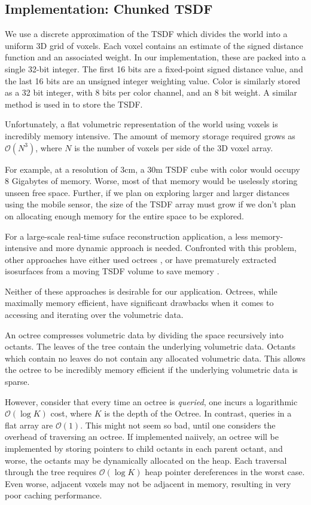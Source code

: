 \documentclass[conference,10pt]{IEEEtran}
\begin{document}
\subsection{Implementation: Chunked TSDF}
We use a discrete approximation of the TSDF which divides the world into
a uniform 3D grid of voxels. Each voxel contains an estimate of the signed
distance function and an associated weight. In our implementation, these are
packed into a single 32-bit integer. The first 16 bits are a fixed-point
signed distance value, and the last 16 bits  are an unsigned integer weighting
value. Color is similarly stored as a 32 bit integer, with 8 bits per color
channel, and an 8 bit weight. A similar method is used in \cite{Newcombe,
Whelan2013, Bylow2013} to store the TSDF.

Unfortunately, a flat volumetric representation of the world using voxels is
incredibly memory intensive. The amount of memory storage required grows as
$\mathcal{O}(N^3)$, where $N$ is the number of voxels per side of the 3D voxel
array.

For example, at a resolution of $3\text{cm}$,  a $30\text{m}$ TSDF cube with
color would occupy 8 Gigabytes of memory. Worse, most of that memory would be
uselessly storing unseen free space. Further, if we plan on exploring larger and larger
distances using the mobile sensor, the size of the TSDF array must grow if we
don't plan on allocating enough memory for the entire space to be explored.

For a large-scale real-time suface reconstruction application, a less
memory-intensive and more dynamic approach is needed. Confronted with this
problem, other approaches have either used  octrees \cite{Wurm2010}, or have
prematurely extracted isosurfaces from a moving TSDF volume to save memory
\cite{Whelan2013}.

Neither of these approaches is desirable for our application. Octrees, while
maximally memory efficient, have significant drawbacks when it comes to
accessing and iterating over the volumetric data.

An octree compresses volumetric data by dividing the space recursively into
octants. The leaves of the tree contain the underlying volumetric data. Octants
which contain no leaves do not contain any allocated volumetric data. This
allows the octree to be incredibly memory efficient if the underlying
volumetric data is sparse.

However, consider that every time an octree is \emph{queried}, one incurs a
logarithmic $\mathcal{O}(\log K)$ cost, where $K$ is the depth of the Octree. In
contrast, queries in a flat array are $\mathcal{O}(1)$. This might not seem so
bad, until one considers the overhead of traversing an octree. If implemented naiively, an
octree will be implemented by storing pointers to child octants in each parent
octant, and worse, the octants may be dynamically allocated on the heap. Each
traversal through the tree requires $\mathcal{O}(\log K)$ heap pointer
dereferences in the worst case. Even worse, adjacent voxels may not be adjacent
in memory, resulting in very poor caching performance.
\end{document}

